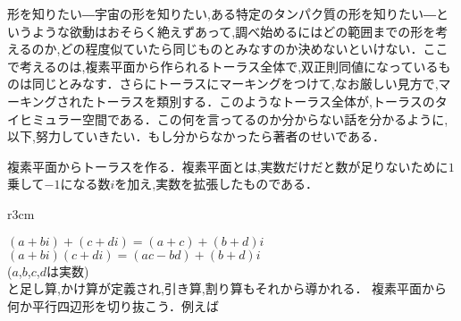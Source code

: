 


形を知りたい―宇宙の形を知りたい,ある特定のタンパク質の形を知りたい―というような欲動はおそらく絶えずあって,調べ始めるにはどの範囲までの形を考えるのか,どの程度似ていたら同じものとみなすのか決めないといけない．ここで考えるのは,複素平面から作られるトーラス全体で,双正則同値になっているものは同じとみなす．さらにトーラスにマーキングをつけて,なお厳しい見方で,マーキングされたトーラスを類別する．このようなトーラス全体が,トーラスのタイヒミュラー空間である．この何を言ってるのか分からない話を分かるように,以下,努力していきたい．もし分からなかったら著者のせいである．

複素平面からトーラスを作る．複素平面とは,実数だけだと数が足りないために$1$乗して$-1$になる数$i$を加え,実数を拡張したものである．
\begin{wrapfigure}{r}{3cm} 
\end{wrapfigure}
$(a+bi)+(c+di)=(a+c)+(b+d)i$\\
$(a+bi)(c+di)=(ac-bd)+(b+d)i$\\
($a$,$b$,$c$,$d$は実数)\\
と足し算,かけ算が定義され,引き算,割り算もそれから導かれる．
複素平面から何か平行四辺形を切り抜こう．例えば\\

